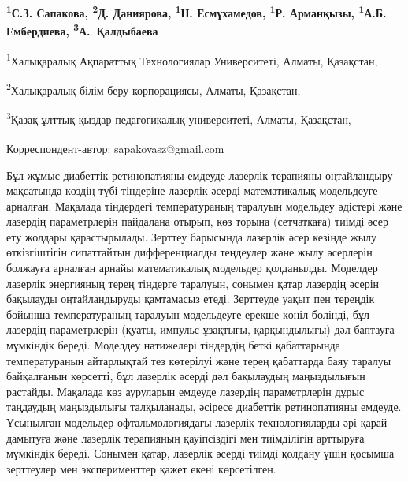
\begin{articleheader}

{\bfseries
\textsuperscript{1}С.З. Сапакова\textsuperscript{\envelope },
\textsuperscript{2}Д. Даниярова,
\textsuperscript{1}Н. Есмұхамедов,
\textsuperscript{1}Р. Арманқызы,
\textsuperscript{1}А.Б. Ембердиева,
\textsuperscript{3}А.~Қалдыбаева
}
\end{articleheader}

\begin{affiliation}
\textsuperscript{1}Халықаралық Ақпараттық Технологиялар Университеті, Алматы, Қазақстан,

\textsuperscript{2}Халықаралық білім беру корпорациясы, Алматы, Қазақстан,

\textsuperscript{3}Қазақ ұлттық қыздар педагогикалық университеті, Алматы, Қазақстан,

\raggedright \textsuperscript{\envelope }Корреспондент-автор: sapakovasz@gmail.com
\end{affiliation}

Бұл жұмыс диабеттік ретинопатияны емдеуде лазерлік терапияны
оңтайландыру мақсатында көз\-дің түбі тіндеріне лазерлік әсерді
математикалық модельдеуге арналған. Мақалада тіндердегі температураның
таралуын модельдеу әдістері және лазердің параметрлерін пайдалана
отырып, көз торына (сетчаткаға) тиімді әсер ету жолдары қарастырылады.
Зерттеу барысында лазерлік әсер кезінде жылу өткізгіштігін сипаттайтын
дифференциалды теңдеулер және жылу әсерлерін болжауға арналған арнайы
математикалық модельдер қолданылды. Моделдер лазерлік энергияның терең
тіндерге таралуын, сонымен қатар лазердің әсерін бақылауды
оңтайландыруды қамтамасыз етеді. Зерттеуде уақыт пен тереңдік бойынша
температураның таралуын модельдеуге ерекше көңіл бөлінді, бұл лазердің
параметрлерін (қуаты, импульс ұзақтығы, қарқындылығы) дәл баптауға
мүмкіндік береді. Моделдеу нәтижелері тіндердің беткі қабаттарында
температураның айтарлықтай тез көтерілуі және терең қабаттарда баяу
таралуы байқалғанын көрсетті, бұл лазерлік әсерді дәл бақылаудың
маңыздылығын растайды. Мақалада көз ауруларын емдеуде лазердің
параметрлерін дұрыс таңдаудың маңыздылығы талқыланады, әсіресе диабеттік
ретинопатияны емдеуде. Ұсынылған модельдер офтальмологиядағы лазерлік
технологияларды әрі қарай дамытуға және лазерлік терапияның қауіпсіздігі
мен тиімділігін арттыруға мүмкіндік береді. Сонымен қатар, лазерлік
әсерді тиімді қолдану үшін қосымша зерттеулер мен эксперименттер қажет
екені көрсетілген.

